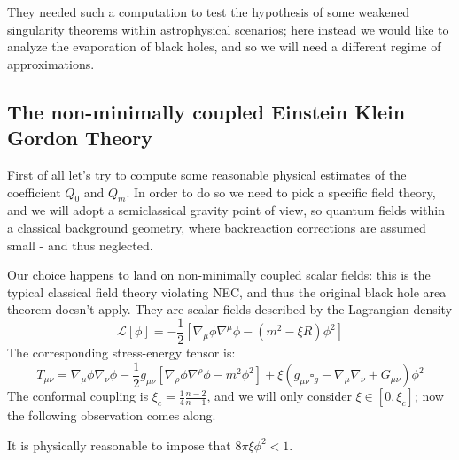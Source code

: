 They needed such a computation to test the hypothesis of some weakened singularity theorems within astrophysical scenarios; here instead we would like to analyze the evaporation of black holes, and so we will need a different regime of approximations.

\subsection{The non-minimally coupled Einstein Klein Gordon Theory}
\label{subsec:non-min-EKG-theory}
First of all let's try to compute some reasonable physical estimates of the coefficient \(Q_0\) and \(Q_m\). In order to do so we need to pick a specific field theory, and we will adopt a semiclassical gravity point of view, so quantum fields within a classical background geometry, where backreaction corrections are assumed small - and thus neglected.

Our choice happens to land on non-minimally coupled scalar fields: this is the typical classical field theory violating NEC, and thus the original black hole area theorem doesn't apply. They are scalar fields described by the Lagrangian density
\[
\mathcal{L}[\phi] = -\frac{1}{2}\left[\nabla_{\mu}\phi\nabla^{\mu}\phi   - (m^2 - \xi R)\phi^2\right]
\]
The corresponding stress-energy tensor is:
\begin{equation}
    T_{\mu\nu} = \nabla_{\mu}\phi\nabla_{\nu}\phi - \frac{1}{2}g_{\mu\nu}\left[\nabla_{\rho}\phi\nabla^{\rho}\phi - m^2\phi^2\right] + \xi\left(g_{\mu\nu}\square_g - \nabla_{\mu}\nabla_{\nu} + G_{\mu\nu}\right)\phi^2
\end{equation}
The conformal coupling is \(\xi_c = \frac{1}{4}\frac{n - 2}{n - 1}\), and we will only consider \(\xi\in [0,\xi_c]\);
now the following observation comes along.

\begin{prop}
    It is physically reasonable to impose that \(8\pi\xi\phi^2 < 1\).
\end{prop}

